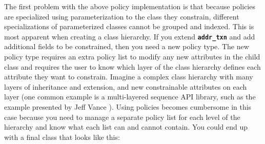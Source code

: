 \documentclass[conference,onecolumn]{IEEEtran}
\newcommand{\code}[1]{
\textbf{\texttt{#1}}
}
\begin{document}
The first problem with the above policy implementation is that because policies are specialized using parameterization to the class they constrain, different specializations of parameterized classes cannot be grouped and indexed. This is most apparent when creating a class hierarchy. If you extend \code{addr_txn} and add additional fields to be constrained, then you need a new policy type. The new policy type requires an extra policy list to modify any new attributes in the child class and requires the user to know which layer of the class hierarchy defines each attribute they want to constrain. Imagine a complex class hierarchy with many layers of inheritance and extension, and new constrainable attributes on each layer (one common example is a multi-layered sequence API library, such as the example presented by Jeff Vance \cite{b5}). Using policies becomes cumbersome in this case because you need to manage a separate policy list for each level of the hierarchy and know what each list can and cannot contain. You could end up with a final class that looks like this:

\end{document}
